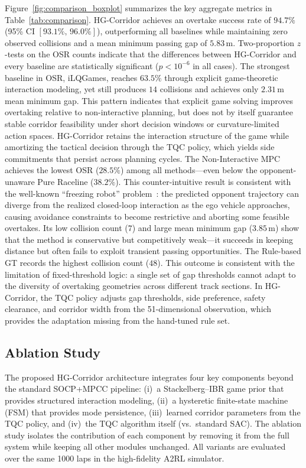 Figure~\ref{fig:comparison_boxplot} summarizes the key aggregate metrics in
Table~\ref{tab:comparison}.  HG-Corridor achieves an overtake success rate of $94.7\%$
(95\% CI $[93.1\%,\,96.0\%]$), outperforming all baselines while maintaining
zero observed collisions and a mean minimum passing gap of
$5.83\,\mathrm{m}$.  Two-proportion $z$-tests on the OSR counts indicate that
the differences between HG-Corridor and every baseline are statistically
significant ($p<10^{-6}$ in all cases).
The strongest baseline in OSR, iLQGames, reaches $63.5\%$ through explicit
game-theoretic interaction modeling, yet still produces $14$ collisions and
achieves only $2.31\,\mathrm{m}$ mean minimum gap.  This pattern indicates
that explicit game solving improves overtaking relative to non-interactive
planning, but does not by itself guarantee stable corridor feasibility under
short decision windows or curvature-limited action spaces.  HG-Corridor
retains the interaction structure of the game while amortizing the tactical
decision through the TQC policy, which yields side commitments that persist
across planning cycles.
The Non-Interactive MPC achieves the lowest OSR ($28.5\%$) among all
methods---even below the opponent-unaware Pure Raceline ($38.2\%$).  This
counter-intuitive result is consistent with the well-known ``freezing robot''
problem~\cite{trautman2010unfreezing}: the predicted opponent trajectory
can diverge from the realized closed-loop interaction as the ego vehicle
approaches, causing avoidance constraints to become restrictive and aborting
some feasible overtakes.  Its low collision count ($7$) and large mean
minimum gap ($3.85\,\mathrm{m}$) show that the method is conservative but
competitively weak---it succeeds in keeping distance but often fails to exploit transient
passing opportunities.
The Rule-based GT records the highest collision count ($48$).  This outcome is
consistent with the limitation of fixed-threshold logic: a single set of
gap thresholds cannot adapt to the diversity of overtaking geometries across
different track sections.  In HG-Corridor, the TQC policy adjusts gap
thresholds, side preference, safety clearance, and corridor width from the
51-dimensional observation, which provides the adaptation missing from the
hand-tuned rule set.

\subsection{Ablation Study}
\label{subsec:ablation}

The proposed HG-Corridor architecture integrates four key components beyond
the standard SOCP+MPCC pipeline: (i)~a Stackelberg--IBR game prior that
provides structured interaction modeling, (ii)~a hysteretic finite-state
machine (FSM) that provides mode persistence, (iii)~learned corridor
parameters from the TQC policy, and (iv)~the TQC algorithm itself (vs.\
standard SAC).  The ablation study isolates the contribution of each
component by removing it from the full system while keeping all other
modules unchanged.  All variants are evaluated over the same 1000 laps in
the high-fidelity A2RL simulator.

